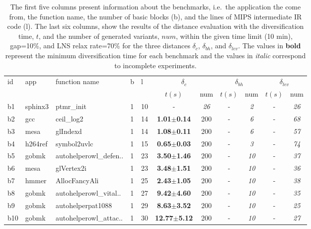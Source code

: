 \begin{longtable}{|l|l|l|l|l||c|c|c|c|c|c|}
\caption{\label{tab:distances}{The first five
		      columns present information about
		      the benchmarks, i.e.\ the application the come from,
		      the function name, the number of basic blocks (b), and 
		      the lines of MIPS intermediate \ac{IR} code (l).
		      The last six columns, show the results of the distance
		      evaluation with
		      the diversification time, $t$, and the number of generated
		      variants, $num$, within the given time limit (10 min), gap=10\%,
		      and \ac{LNS} relax rate=70\%
		      for the three distances $\delta_c$, $\delta_{bh}$,
		      and $\delta_{lev}$.
		      The values in  \textbf{bold} represent the minimum 
		      diversification time for each benchmark and the values in \emph{italic} 
		      correspond to incomplete experiments.}}\\
\hline
\multirow{2}{*}{id}&\multirow{2}{*}{app}&\multirow{2}{*}{function name}&\multirow{2}{*}{b}&\multirow{2}{*}{l}&\multicolumn{2}{c|}{$\delta_c$}&\multicolumn{2}{c|}{$\delta_{bh}$}&\multicolumn{2}{c|}{$\delta_{lev}$}\\
\cline{6-11}
&&&&&$t(s)$&num&$t(s)$&num&$t(s)$&num\\
\hline
b1&sphinx3&ptmr\_init&1&10&- & \textit{26 }&- & \textit{2 }&- & \textit{26 }
\\
b2&gcc&ceil\_log2&1&14&\textbf{1.01$\pm$0.14} & 200 &- & \textit{6 }&- & \textit{68 }
\\
b3&mesa&glIndexd&1&14&\textbf{1.08$\pm$0.11} & 200 &- & \textit{6 }&- & \textit{57 }
\\
b4&h264ref&symbol2uvlc&1&15&\textbf{0.65$\pm$0.03} & 200 &- & \textit{3 }&- & \textit{74 }
\\
b5&gobmk&autohelperowl\_defen..&1&23&\textbf{3.50$\pm$1.46} & 200 &- & \textit{10 }&- & \textit{37 }
\\
b6&mesa&glVertex2i&1&23&\textbf{3.48$\pm$1.51} & 200 &- & \textit{10 }&- & \textit{36 }
\\
b7&hmmer&AllocFancyAli&1&25&\textbf{2.43$\pm$1.05} & 200 &- & \textit{10 }&- & \textit{38 }
\\
b8&gobmk&autohelperowl\_vital..&1&27&\textbf{9.42$\pm$4.60} & 200 &- & \textit{10 }&- & \textit{35 }
\\
b9&gobmk&autohelperpat1088&1&29&\textbf{8.63$\pm$3.52} & 200 &- & \textit{10 }&- & \textit{25 }
\\
b10&gobmk&autohelperowl\_attac..&1&30&\textbf{12.77$\pm$5.12} & 200 &- & \textit{10 }&- & \textit{27 }

\end{longtable}
